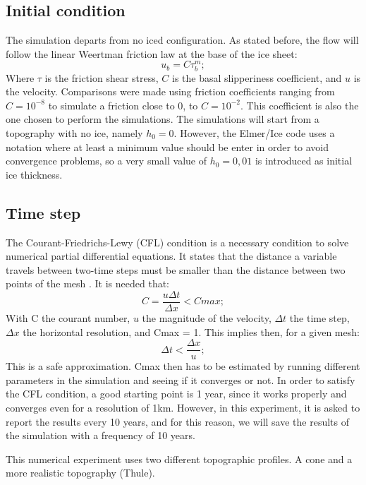 \documentclass{article}
\begin{document}
\subsection{Initial condition}
The simulation departs from no iced configuration. 
As stated before, the flow will follow the linear Weertman friction law at the base of the ice sheet:
\begin{equation}
	u_b=C\tau_b^m;
\end{equation}
Where $\tau$ is the friction shear stress, $C$ is the basal slipperiness coefficient, and $u$ is the velocity.
Comparisons were made using friction coefficients ranging from $C=10^{-8}$ to simulate a friction close to 0, to $C=10^{-2}$. This coefficient is also the one chosen to perform the simulations.
The simulations will start from a topography with no ice, namely $h_0 = 0$. However, the Elmer/Ice code uses a notation where at least a minimum value should be enter in order to avoid convergence problems, so a very small value of $h_0 = 0,01$ is introduced as initial ice thickness. 
\subsection{Time step}
The Courant-Friedrichs-Lewy (CFL) condition is a necessary condition to solve numerical partial differential equations. It states that the distance a variable travels between two-time steps must be smaller than the distance between two points of the mesh \cite[]{courant1967partial}. It is needed that:
\begin{equation}
	C=\frac{u\Delta t}{\Delta x}<Cmax;
\end{equation}
With C the courant number, $u$ the magnitude of the velocity, $\Delta t$ the time step, $\Delta x$ the horizontal resolution, and Cmax = 1. This implies then, for a given mesh:
\begin{equation}
	\Delta t < \frac{\Delta x}{u};
\end{equation}
This is a safe approximation. Cmax then has to be estimated by running different parameters in the simulation and seeing if it converges or not. In order to satisfy the CFL condition, a good starting point is 1 year, since it works properly and converges even for a resolution of 1km.
However, in this experiment, it is asked to report the results every 10 years, and for this reason, we will save the results of the simulation with a frequency of 10 years. 

This numerical experiment uses two different topographic profiles. A cone and a more realistic topography (Thule).
\end{document}
